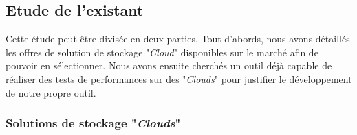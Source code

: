 \documentclass[10pt]{article}
\begin{document}
\subsection{Etude de l'existant}

Cette étude peut être divisée en deux parties. Tout d’abords, nous avons détaillés les offres de solution de stockage "\textit{Cloud}" disponibles sur le marché afin de pouvoir en sélectionner. Nous avons ensuite cherchés un outil déjà capable de réaliser des tests de performances sur des "\textit{Clouds}" pour justifier le développement de notre propre outil.

\newpage

\subsubsection{Solutions de stockage "\textit{Clouds}"}
\end{document}
